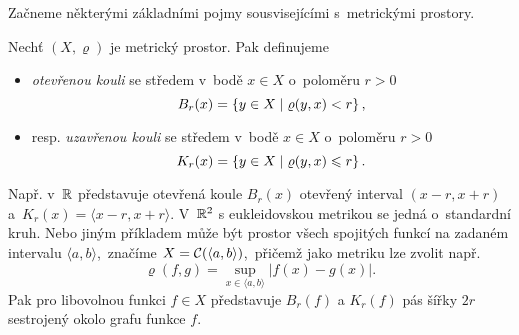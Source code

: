 Začneme některými základními pojmy sousvisejícími s~metrickými prostory.
\begin{definition}\label{def:koule-mp}
    Nechť $(X,\varrho)$ je metrický prostor. Pak definujeme
    \begin{itemize}
        \item \emph{otevřenou kouli} se středem v~bodě $x\in X$ o~poloměru $r>0$
        \[B_r(x)=\left\{y\in X\mid\varrho(y,x)<r\right\},\]
        \item resp. \emph{uzavřenou kouli} se středem v~bodě $x\in X$ o~poloměru $r>0$
        \[K_r(x)=\left\{y\in X\mid\varrho(y,x)\leqslant r\right\}.\]
    \end{itemize}
\end{definition}
Např. v~$\mathbb{R}$ představuje otevřená koule $B_r(x)$ otevřený interval $(x-r,x+r)$ a~$K_r(x)=\langle x-r,x+r\rangle$. V~$\mathbb{R}^2$ s eukleidovskou metrikou se jedná o~standardní kruh. Nebo jiným příkladem může být prostor všech spojitých funkcí na zadaném intervalu $\langle a,b\rangle$,~značíme $X=\mathcal{C}(\langle a,b\rangle)$,~přičemž jako metriku lze zvolit např.
\[\varrho(f,g)=\sup_{x\in\langle a,b\rangle}|f(x)-g(x)|.\]
Pak pro libovolnou funkci $f\in X$ představuje $B_r(f)$ a $K_r(f)$ pás šířky $2r$ sestrojený okolo grafu funkce $f$.

